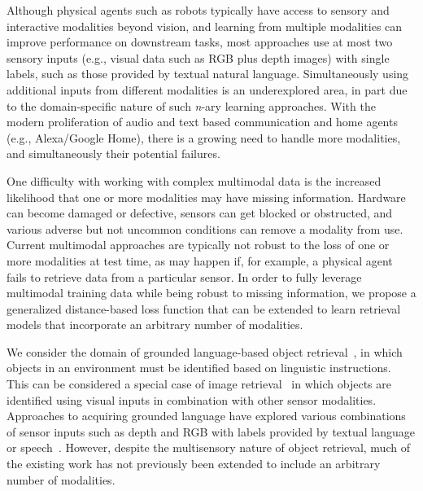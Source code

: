 \documentclass[10pt]{article} %
\begin{document}
Although physical agents such as robots typically have access to sensory and interactive modalities beyond vision, and learning from multiple modalities can improve performance on downstream tasks, most approaches use at most two sensory inputs (e.g., visual data such as RGB plus depth images) with single labels, such as those provided by textual natural language. Simultaneously using additional inputs from different modalities is an underexplored area, in part due to the domain-specific nature of such \textit{n}-ary learning approaches. With the modern proliferation of audio and text based communication and home agents (e.g., Alexa/Google Home), there is a growing need to handle more modalities, and simultaneously their potential failures. 

One difficulty with working with complex multimodal data is the increased likelihood that one or more modalities may have missing information. Hardware can become damaged or defective, sensors can get blocked or obstructed, and various adverse but not uncommon conditions can remove a modality from use.
Current multimodal approaches are typically not robust to the loss of one or more modalities at test time, as may happen if, for example, a physical agent fails to retrieve data from a particular sensor. In order to fully leverage multimodal training data while being robust to missing information, we propose a generalized distance-based loss function that can be extended to learn retrieval models that incorporate an arbitrary number of modalities.

We consider the domain of grounded language-based object retrieval~\citep{hu2016natural, triplet_loss_2021_CVPR}, in which objects in an environment must be identified based on linguistic instructions. This can be considered a special case of image retrieval~\citep{huang2017deep, ma2020large, novak2015large, vo2019composing} in which objects are identified using visual inputs in combination with other sensor modalities. Approaches to acquiring grounded language have explored various combinations of sensor inputs such as depth and RGB with labels provided by textual language or  speech~\citep{RichardsDarvishMatuszekCategoryFree20}. 
However, despite the multisensory nature of object retrieval, much of the existing work has not previously been extended to include an arbitrary number of modalities. 

\end{document}
